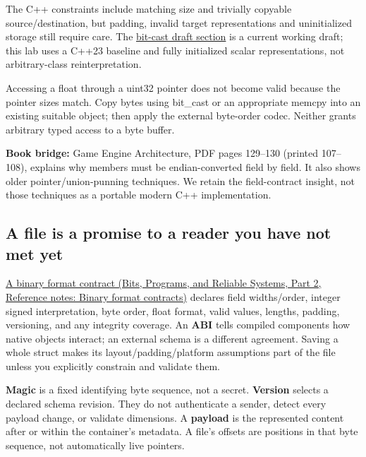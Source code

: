 The C++ constraints include matching size and trivially copyable source/destination, but padding, invalid target representations and uninitialized storage still require care. The \href{https://eel.is/c++draft/bit.cast}{bit-cast draft section} is a current working draft; this lab uses a C++23 baseline and fully initialized scalar representations, not arbitrary-class reinterpretation.

Accessing a float through a uint32 pointer does not become valid because the pointer sizes match. Copy bytes using bit\_cast or an appropriate memcpy into an existing suitable object; then apply the external byte-order codec. Neither grants arbitrary typed access to a byte buffer.

\textbf{Book bridge:} Game Engine Architecture, PDF pages 129--130 (printed 107--108), explains why members must be endian-converted field by field. It also shows older pointer/union-punning techniques. We retain the field-contract insight, not those techniques as a portable modern C++ implementation.

\subsection{A file is a promise to a reader you have not met yet}\label{05-engine-i-ch002-a-file-is-a-promise-to-a-reader-you-have-not-met-yet}

\hypertarget{05-engine-i-ch002-a-file-is-a-promise-to-a-reader-you-have-not-met-yet}{}

\href{../01-Bits-Programs-and-Reliable-Systems-P02/main.pdf\#nameddest=appendix-590bbb2424c1}{A binary format contract (Bits, Programs, and Reliable Systems, Part 2, Reference notes: Binary format contracts)} declares field widths/order, integer signed interpretation, byte order, float format, valid values, lengths, padding, versioning, and any integrity coverage. An \textbf{ABI} tells compiled components how native objects interact; an external schema is a different agreement. Saving a whole struct makes its layout/padding/platform assumptions part of the file unless you explicitly constrain and validate them.

\textbf{Magic} is a fixed identifying byte sequence, not a secret. \textbf{Version} selects a declared schema revision. They do not authenticate a sender, detect every payload change, or validate dimensions. A \textbf{payload} is the represented content after or within the container's metadata. A file's offsets are positions in that byte sequence, not automatically live pointers.

